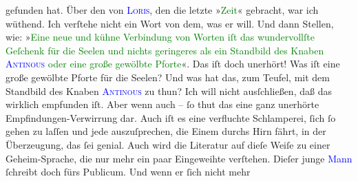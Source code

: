                gefunden hat.\pend
           \pstart
           Über den \label{K_L02775-13v}\label{K_L02775-13h} von \textsc{\textcolor{blue}{Loris}{}\ledrightnote{\textcolor{blue}{Hugo von Hofmannsthal}}}, den die letzte »\textcolor{green}{Zeit}{}\ledrightnote{\textcolor{green}{Die Zeit. Wiener Wochenschrift}}« gebracht, war ich
               wüthend. Ich verſtehe nicht ein Wort von dem, was er will. Und dann Stellen, wie:
                  »\textcolor{green}{Eine neue und kühne Verbindung
                  von Worten iſt das wundervollſte Geſchenk für die Seelen und nichts geringeres als
                  ein Standbild des Knaben \textsc{\textcolor{blue}{Antinous}{}\ledrightnote{\textcolor{blue}{Antinoos}}} oder eine große gewölbte Pforte}{}«. Das iſt doch unerhört! Was iſt eine
               große gewölbte {\pb}Pforte für die Seelen? Und was hat
               das, zum Teufel, mit dem Standbild des Knaben \textsc{\textcolor{blue}{Antinous}{}\ledrightnote{\textcolor{blue}{Antinoos}}} zu thun? Ich will nicht ausſchließen, daß das wirklich empfunden iſt. Aber wenn
               auch – ſo thut das eine ganz unerhörte Empfindungen-Verwirrung dar. Auch iſt es eine
               verfluchte Schlamperei, ſich ſo gehen zu laſſen und jede \label{K_L02775-22v}\label{K_L02775-22h}
               auszuſprechen, die Einem durchs Hirn fährt,  in der Überzeugung, das {\pb}ſei genial. Auch
               wird die Literatur auf dieſe Weiſe zu einer Geheim-Sprache, die nur mehr ein paar
               Eingeweihte verſtehen. Dieſer junge \textcolor{blue}{Mann}{} ſchreibt doch fürs Publicum. Und wenn er ſich nicht mehr
